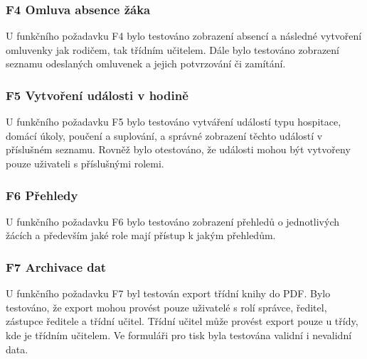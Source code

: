 \subsubsection*{F4 Omluva absence žáka}
U funkčního požadavku F4 bylo testováno zobrazení absencí a následné vytvoření omluvenky jak rodičem, tak třídním učitelem. Dále bylo testováno zobrazení seznamu odeslaných omluvenek a jejich potvrzování či zamítání.

\subsubsection*{F5 Vytvoření události v hodině}
U funkčního požadavku F5 bylo testováno vytváření událostí typu hospitace, domácí úkoly, poučení a suplování, a správné zobrazení těchto událostí v příslušném seznamu. Rovněž bylo otestováno, že události mohou být vytvořeny pouze uživateli s příslušnými rolemi.

\subsubsection*{F6 Přehledy}
U funkčního požadavku F6 bylo testováno zobrazení přehledů o jednotlivých žácích a především jaké role mají přístup k jakým přehledům.

\subsubsection*{F7 Archivace dat}
U funkčního požadavku F7 byl testován export třídní knihy do PDF. Bylo testováno, že export mohou provést pouze uživatelé s rolí správce, ředitel, zástupce ředitele a třídní učitel. Třídní učitel může provést export pouze u třídy, kde je třídním učitelem. Ve formuláři pro tisk byla testována validní i nevalidní data.

